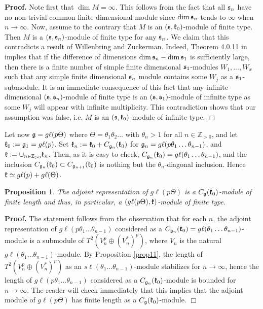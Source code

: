 \documentclass[12pt]{article}
\newcounter{theorem}
\newtheorem{prop}[theo]{Proposition}
\newenvironment{proof}{ \textbf{Proof.}}{$\Box$}
\newcommand {\ZZ} {\mathbb {Z}}
\newcommand{\refprop}[1]{Proposition \ref{#1}}
\newcommand{\gl}{{g\ell}}
\renewcommand{\sl}{{s\ell}}
\begin{document}
\begin{proof} Note first that $\dim M = \infty$.  This follows from
the fact that all $\frak s_n$ have no non-trivial common finite dimensional module since $\dim \frak s_n$ tends to $\infty$ when $n\to\infty$.  Now, assume to the contrary that $M$ is an $(\frak s, \frak k_0)$-module of finite type.  Then $M$ is a $(\frak s, \frak s_n)$-module of finite type for any $\frak s_n$.  We claim that this contradicts a result of Willenbring and Zuckerman. Indeed, Theorem 4.0.11 in \cite{WZ} implies that if the difference of dimensions $\dim \frak s_n - \dim \frak s_1$ is sufficiently large, then there is a finite number of simple finite dimensional $\frak s_1$-modules $W_1,\ldots, W_x$ such that any simple finite dimensional $\frak s_n$ module contains some $W_j$ as a $\frak s_1$-submodule.  It is an immediate consequence of this fact that any infinite dimensional $(\frak s, \frak s_n)$-module of finite type is an $(\frak s,\frak s_1)$-module of infinite type as some $W_j$ will appear with infinite multiplicity.  This contradiction shows that our assumption was false, i.e. $M$ is an $(\frak s,\frak k_0)$-module of infinite type.
\end{proof}

Let now $\frak g = \gl (p\Theta)$ where $\Theta = \theta_1\theta_2\ldots$ with $\theta_n > 1$ for all $n\in\ZZ_{>0}$, and let $\frak k_0 := \frak g_1 = \gl (p)$.  Set $\frak k_n := \frak k_0 + C_{\frak g_{n}} (\frak k_0)$ for $\frak g_n = \gl (p\theta_1\ldots \theta_{n-1})$, and $\frak k:= \cup_{n\in\ZZ_{>0}}\frak k_n$.  Then, as it is easy to check, $C_{\frak g_{n}} (\frak k_0) = \gl (\theta_1\ldots\theta_{n-1})$, and the inclusion $C_{\frak g_{n}} (\frak k_0)\subset C_{\frak g_{n+1}} (\frak k_0)$ is nothing but the $\theta_{n}$-diagonal inclusion.  Hence $\frak k\simeq \gl (p)+ \gl (\Theta)$.

\begin{prop}  The adjoint representation of $\gl (p\Theta)$ is a $C_{\frak g} (\frak k_0)$-module of finite length and thus, in particular, a $(\gl (p\Theta),\frak k)$-module of finite type.
\end{prop}

\begin{proof}  The statement follows from the observation that for each $n$, the adjoint representation of $\gl (p \theta_1\ldots \theta_{n-1})$ considered as a $C_{\frak g_{n}}(\frak k_0) = \gl (\theta_1\ldots \theta_{n-1})$-module is a submodule of $T^2(V^p_n \oplus (V^*_n)^p)$, where $V_n$ is the natural $\gl (\theta_1\ldots\theta_{n-1})$-module.  By \refprop{prop11}, the length of $T^2(V^p_n\oplus (V^*_n)^p)$ as an $\sl (\theta_1\ldots\theta_{n-1})$-module stabilizes for $n\to\infty$, hence the length of $\gl (p\theta_1\ldots\theta_{n-1})$ considered as a $C_{\frak g_{n}}(\frak k_0)$-module is bounded for $n\to\infty$. The reader will check immediately that this implies that the adjoint module of $\gl (p\Theta)$ has finite length as a $C_{\frak g}(\frak k_0)$-module.
\end{proof}
\end{document}
